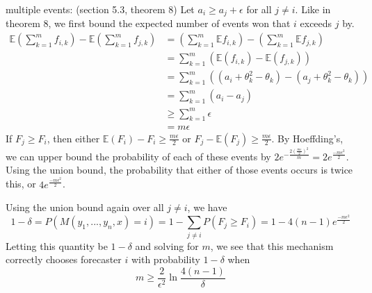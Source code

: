 \documentclass[letterpaper,12pt]{article}
\newcommand{\E}{\mathbb{E}}
\newcommand{\1}{\mathbbm{1}}
\begin{document}
multiple events: (section 5.3, theorem 8)
Let $a_i \geq a_j + \epsilon$ for all $j\neq i$. Like in theorem 8, we first bound the expected number of events won that $i$ exceeds $j$ by. 
\begin{align*}
  \E \left( \sum_{k=1}^m f_{i, k}\right) - \E \left( \sum_{k=1}^m f_{j, k}\right)
  &= \left( \sum_{k=1}^m \E f_{i, k}\right) - \left( \sum_{k=1}^m \E f_{j, k}\right)\\
  &= \sum_{k=1}^m \left(\E (f_{i, k}) - \E (f_{j, k})\right)\\
  &= \sum_{k=1}^m \left((a_i + \theta_k^2 - \theta_k) - (a_j + \theta_k^2 - \theta_k)\right)\\
  &= \sum_{k=1}^m \left(a_i - a_j\right)\\
  &\geq \sum_{k=1}^m \epsilon\\
  &=m \epsilon
\end{align*}
If $F_j \geq F_i$, then either $\E(F_i) - F_i \geq \frac{m \epsilon}{2}$ or $F_j - \E(F_j) \geq \frac{m \epsilon}{2}$. By Hoeffding's, we can upper bound the probability of each of these events by $2 e^{-\frac{2 (\frac{m \epsilon}{2})^2}{m}} = 2 e^{\frac{- m \epsilon^2}{2}}$. Using the union bound, the probability that either of those events occurs is twice this, or $4 e^{\frac{- m \epsilon^2}{2}}$.

Using the union bound again over all $j \neq i$, we have 
\[
1 - \delta = P(M(y_1, ..., y_n, x) = i) = 1 - \sum_{j \neq i} P(F_j \geq F_i) = 1 - 4 (n-1) e^{\frac{- m \epsilon^2}{2}}
\]
Letting this quantity be $1 - \delta$ and solving for $m$, we see that this mechanism correctly chooses forecaster $i$ with probability $1 - \delta$ when 
\[ m \geq \frac{2}{\epsilon^2} \ln \frac{4(n-1)}{\delta} \]



\end{document}
